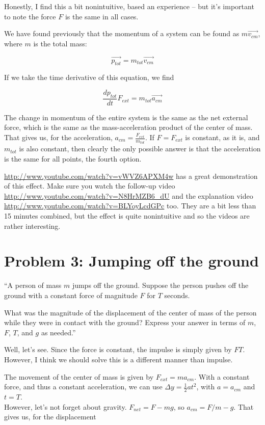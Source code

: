 \documentclass[8.01x]{subfiles}
\begin{document}
Honestly, I find this a bit nonintuitive, based an experience -- but it's important to note the force $F$ is the same in all cases.

We have found previously that the momentum of a system can be found as $m \vec{v_{cm}}$, where $m$ is the total mass:

\begin{equation}
\vec{p_{tot}} = m_{tot} \vec{v_{cm}}
\end{equation}

If we take the time derivative of this equation, we find

\begin{equation}
\frac{d p_{tot}}{dt} F_{ext} = m_{tot} \vec{a_{cm}}
\end{equation}

The change in momentum of the entire system is the same as the net external force, which is the same as the mass-acceleration product of the center of mass. That gives us, for the acceleration, $\displaystyle a_{cm} = \frac{F_{ext}}{m_{tot}}$. If $F = F_{ext}$ is constant, as it is, and $m_{tot}$ is also constant, then clearly the only possible answer is that the acceleration is the same for all points, the fourth option.

\url{http://www.youtube.com/watch?v=vWVZ6APXM4w} has a great demonstration of this effect. Make sure you watch the follow-up video \url{http://www.youtube.com/watch?v=N8HrMZB6_dU} and the explanation video \url{http://www.youtube.com/watch?v=BLYoyLcdGPc} too. They are a bit less than 15 minutes combined, but the effect is quite nonintuitive and so the videos are rather interesting.

\section{Problem 3: Jumping off the ground}

``A person of mass $m$ jumps off the ground. Suppose the person pushes off the ground with a constant force of magnitude $F$ for $T$ seconds.

What was the magnitude of the displacement of the center of mass of the person while they were in contact with the ground? Express your answer in terms of $m$, $F$, $T$, and $g$ as needed.''

Well, let's see. Since the force is constant, the impulse is simply given by $F T$. However, I think we should solve this is a different manner than impulse.

The movement of the center of mass is given by $F_{ext} = m a_{cm}$. With a constant force, and thus a constant acceleration, we can use $\Delta y = \frac{1}{2} a t^2$, with $a = a_{cm}$ and $t = T$.\\
However, let's not forget about gravity. $F_{net} = F - m g$, so $a_{cm} = F/m - g$. That gives us, for the displacement
\end{document}
